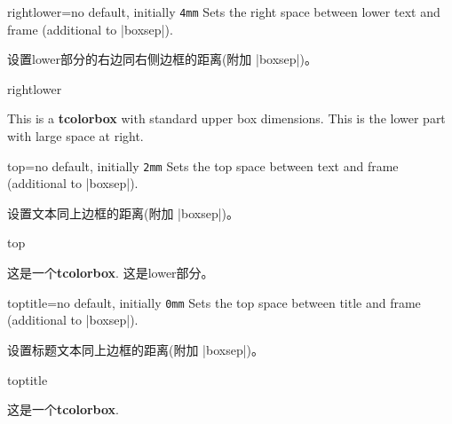 \begin{docTcbKey}{rightlower}{=}{no default, initially \texttt{4mm}}
  Sets the right space between lower text and frame (additional to |boxsep|).

设置lower部分的右边同右侧边框的距离(附加 |boxsep|)。
\begin{exdispExample}{rightlower}

\begin{tcolorbox}[width=5cm,rightlower=2cm]
This is a \textbf{tcolorbox} with standard upper box dimensions.
\tcblower
This is the lower part with large space at right.
\end{tcolorbox}
\end{exdispExample}
\end{docTcbKey}



\begin{docTcbKey}{top}{=}{no default, initially \texttt{2mm}}
  Sets the top space between text and frame (additional to |boxsep|).

设置文本同上边框的距离(附加 |boxsep|)。
\begin{exdispExample}{top}

\begin{tcolorbox}[top=0mm]
这是一个\textbf{tcolorbox}.
\tcblower
这是lower部分。
\end{tcolorbox}
\end{exdispExample}
\end{docTcbKey}


\begin{docTcbKey}{toptitle}{=}{no default, initially \texttt{0mm}}
  Sets the top space between title and frame (additional to |boxsep|).

设置标题文本同上边框的距离(附加 |boxsep|)。    
\begin{exdispExample}{toptitle}

\begin{tcolorbox}[toptitle=3mm,title=My title]
这是一个\textbf{tcolorbox}.
\end{tcolorbox}
\end{exdispExample}
\end{docTcbKey}






